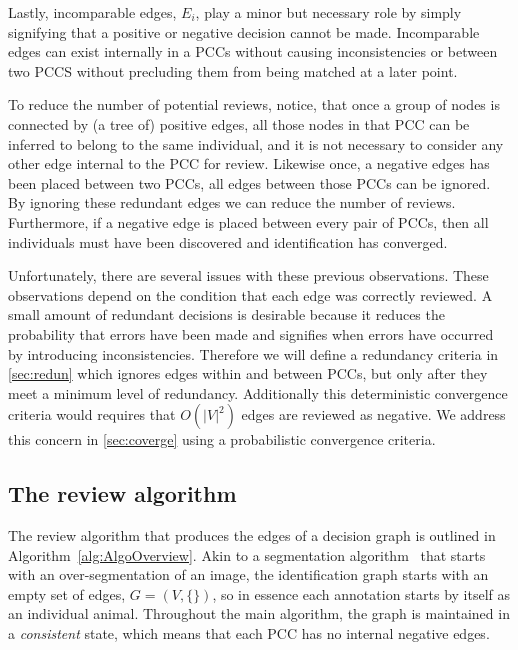 Lastly, incomparable edges, $E_i$, play a minor but necessary role by simply signifying that a positive or negative
decision cannot be made.  Incomparable edges can exist internally in a PCCs without causing inconsistencies or
between two PCCS without precluding them from being matched at a later point.

To reduce the number of potential reviews, notice, that once a group of nodes is connected by (a tree of) positive
edges, all those nodes in that PCC can be inferred to belong to the same individual, and it is not necessary to
consider any other edge internal to the PCC for review. Likewise once, a negative edges has been placed between two
PCCs, all edges between those PCCs can be ignored. By ignoring these redundant edges we can reduce the number of
reviews. Furthermore, if a negative edge is placed between every pair of PCCs, then all individuals must have been
discovered and identification has converged.

Unfortunately, there are several issues with these previous observations. These observations depend on the
condition that each edge was correctly reviewed. A small amount of redundant decisions is desirable because it
reduces the probability that errors have been made and signifies when errors have occurred by introducing
inconsistencies. Therefore we will define a redundancy criteria in \cref{sec:redun} which ignores edges within and
between PCCs, but only after they meet a minimum level of redundancy. Additionally this deterministic convergence
criteria would requires that $O(|V|^2)$ edges are reviewed as negative. We address this concern in
\cref{sec:coverge} using a probabilistic convergence criteria.


\subsection{The review algorithm}\label{sub:graphalgo}


The review algorithm that produces the edges of a decision graph is outlined in Algorithm~\ref{alg:AlgoOverview}.
Akin to a segmentation algorithm~\cite{fulkerson_class_2009} that starts with an over-segmentation of an image, the
identification graph starts with an empty set of edges, $G = (V, \{ \})$, so in essence each annotation starts by
itself as an individual animal. Throughout the main algorithm, the graph is maintained in a \emph{consistent}
state, which means that each PCC has no internal negative edges.

